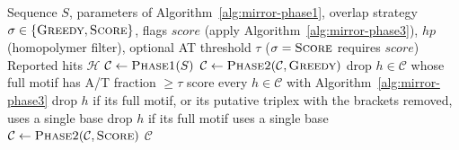 \documentclass{article}
\begin{document}
\begin{algorithm}
\caption{HSeeker Pipeline: Order of Stages}
\label{alg:pipeline}
\small
\begin{algorithmic}[1]
\Require Sequence $S$, parameters of Algorithm~\ref{alg:mirror-phase1},
         overlap strategy $\sigma \in \{\textsc{Greedy}, \textsc{Score}\}$,
         flags $\mathit{score}$ (apply Algorithm~\ref{alg:mirror-phase3}),
         $\mathit{hp}$ (homopolymer filter), optional AT threshold $\tau$
         ($\sigma = \textsc{Score}$ requires $\mathit{score}$)
\Ensure Reported hits $\mathcal{H}$
\State $\mathcal{C} \gets \textsc{Phase1}(S)$
    \State $\mathcal{C} \gets \textsc{Phase2}(\mathcal{C}, \textsc{Greedy})$
\EndIf
{}
    \State drop $h \in \mathcal{C}$ whose full motif has A/T fraction $\ge \tau$
\EndIf
{}
    \State score every $h \in \mathcal{C}$ with Algorithm~\ref{alg:mirror-phase3}
        \State drop $h$ if its full motif, or its putative triplex with the
               brackets removed, uses a single base
    \EndIf
{}
    \State drop $h$ if its full motif uses a single base
\EndIf
{}
    \State $\mathcal{C} \gets \textsc{Phase2}(\mathcal{C}, \textsc{Score})$
\EndIf
\State \Return $\mathcal{C}$
\end{algorithmic}
\end{algorithm}

\clearpage
\end{document}
